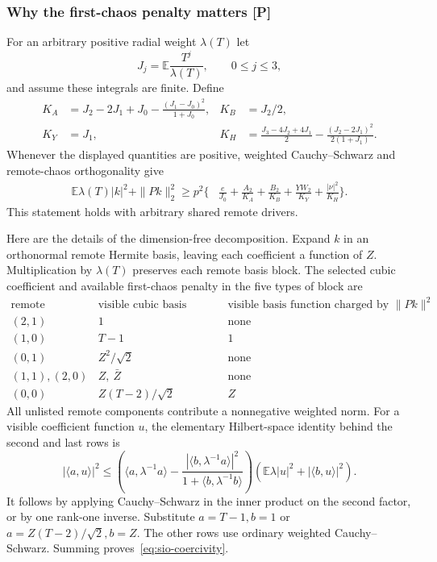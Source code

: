 \subsubsection{Why the first-chaos penalty matters [P]}
For an arbitrary positive radial weight $\lambda(T)$ let
\[
 J_j=\mathbb E\frac{T^j}{\lambda(T)},\qquad 0\le j\le3,
\]
and assume these integrals are finite. Define
\begin{align*}
 K_A&=J_2-2J_1+J_0-\frac{(J_1-J_0)^2}{1+J_0},&
 K_B&=J_2/2,\\
 K_Y&=J_1,&
 K_H&=\frac{J_3-4J_2+4J_1}{2}
                  -\frac{(J_2-2J_1)^2}{2(1+J_1)}.
\end{align*}
Whenever the displayed quantities are positive, weighted Cauchy--Schwarz
and remote-chaos orthogonality give
\begin{equation}\label{eq:sio-coercivity}
\boxed{\begin{aligned}
 \mathbb E\lambda(T)|k|^2+\|Pk\|_2^2\ge p^2\bigg\{&
 \frac{e}{J_0}+\frac{A_2}{K_A}+\frac{B_2}{K_B}
 +\frac{YW_2}{K_Y}+\frac{|\nu|^2}{K_H}\bigg\}.
\end{aligned}}
\end{equation}
This statement holds with arbitrary shared remote drivers.

Here are the details of the dimension-free decomposition. Expand $k$ in
an orthonormal remote Hermite basis, leaving each coefficient a function
of $Z$. Multiplication by $\lambda(T)$ preserves each remote basis block.
The selected cubic coefficient and available first-chaos penalty in the
five types of block are
\[
\begin{array}{c|c|c}
 \text{remote bidegree}&\text{visible cubic basis function}
     &\text{visible basis function charged by }\|Pk\|^2\\\hline
 (2,1)&1&\text{none}\\
 (1,0)&T-1&1\\
 (0,1)&Z^2/\sqrt2&\text{none}\\
 (1,1),(2,0)&Z,\ \bar Z&\text{none}\\
 (0,0)&Z(T-2)/\sqrt2&Z
\end{array}
\]
All unlisted remote components contribute a nonnegative weighted norm.
For a visible coefficient function $u$, the elementary Hilbert-space
identity behind the second and last rows is
\[
 |\langle a,u\rangle|^2\le
 \left(\langle a,\lambda^{-1}a\rangle
 -\frac{|\langle b,\lambda^{-1}a\rangle|^2}
             {1+\langle b,\lambda^{-1}b\rangle}\right)
 \left(\mathbb E\lambda|u|^2+|\langle b,u\rangle|^2\right).
\]
It follows by applying Cauchy--Schwarz in the inner product on the second
factor, or by one rank-one inverse. Substitute $a=T-1,b=1$ or
$a=Z(T-2)/\sqrt2,b=Z$. The other rows use ordinary weighted
Cauchy--Schwarz. Summing proves~\eqref{eq:sio-coercivity}.

